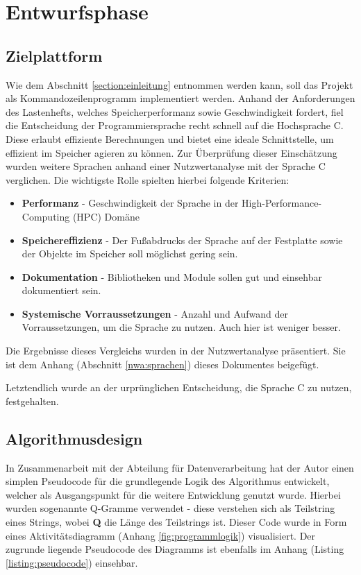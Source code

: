 \section{Entwurfsphase}
\label{section:entwurfsphase}
\subsection{Zielplattform}
Wie dem Abschnitt \ref{section:einleitung} entnommen werden kann, soll das Projekt als Kommandozeilenprogramm
implementiert werden. Anhand der Anforderungen des Lastenhefts, welches Speicherperformanz sowie Geschwindigkeit fordert,
fiel die Entscheidung der Programmiersprache recht schnell auf die Hochsprache C. Diese erlaubt effiziente Berechnungen und bietet eine ideale Schnittstelle, um effizient im Speicher agieren zu können.
Zur Überprüfung dieser Einschätzung wurden weitere Sprachen anhand einer
Nutzwertanalyse mit der Sprache C verglichen. Die wichtigste Rolle spielten hierbei folgende Kriterien:
\begin{itemize}
    \item \textbf{Performanz} - Geschwindigkeit der Sprache in der High-Performance-Computing (HPC) Domäne
    \item \textbf{Speichereffizienz} - Der Fußabdrucks der Sprache auf der Festplatte sowie der Objekte im Speicher soll möglichst gering sein. 
    \item \textbf{Dokumentation} - Bibliotheken und Module sollen gut und einsehbar dokumentiert sein.
    \item \textbf{Systemische Vorraussetzungen} - Anzahl und Aufwand der Vorraussetzungen, um die Sprache zu nutzen. Auch hier ist weniger besser.
\end{itemize}

Die Ergebnisse dieses Vergleichs wurden in der Nutzwertanalyse präsentiert.
Sie ist dem Anhang (Abschnitt \ref{nwa:sprachen})  dieses Dokumentes beigefügt.\par
Letztendlich wurde an der urprünglichen Entscheidung, die Sprache C zu nutzen, festgehalten.

\subsection{Algorithmusdesign}
In Zusammenarbeit mit der Abteilung für Datenverarbeitung hat der Autor einen simplen
Pseudocode für die grundlegende Logik des Algorithmus entwickelt, welcher als Ausgangspunkt
für die weitere Entwicklung genutzt wurde. Hierbei wurden sogenannte Q-Gramme verwendet - 
diese verstehen sich als Teilstring eines Strings, wobei \textbf{Q} die Länge des Teilstrings ist. Dieser Code wurde in Form eines
Aktivitätsdiagramm (Anhang \ref{fig:programmlogik}) visualisiert. Der zugrunde liegende  Pseudocode des Diagramms ist ebenfalls im Anhang (Listing \ref{listing:pseudocode}) einsehbar.



